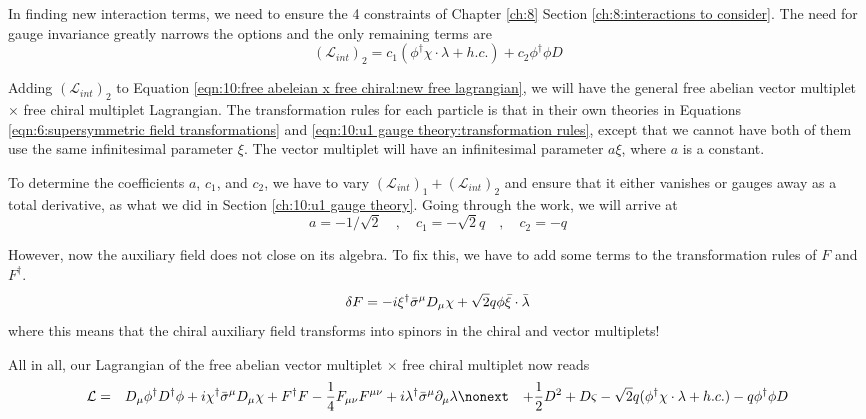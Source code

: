 In finding new interaction terms, we need to ensure the 4 constraints of Chapter \ref{ch:8} Section \ref{ch:8:interactions to consider}. The need for gauge invariance greatly narrows the options and the only remaining terms are
\begin{equation}
    \left(\mathcal{L}_{int}\right)_2 = c_1 \left(\phi^\dagger \chi \cdot \lambda + h.c.\right) + c_2 \phi^\dagger \phi D
\end{equation}

Adding $\left(\mathcal{L}_{int}\right)_2$ to Equation \ref{eqn:10:free abeleian x free chiral:new free lagrangian}, we will have the general free abelian vector multiplet $\times$ free chiral multiplet Lagrangian. The transformation rules for each particle is that in their own theories in Equations \ref{eqn:6:supersymmetric field transformations} and \ref{eqn:10:u1 gauge theory:transformation rules}, except that we cannot have both of them use the same infinitesimal parameter $\xi$. The vector multiplet will have an infinitesimal parameter $a\xi$, where $a$ is a constant. 

To determine the coefficients $a$, $c_1$, and $c_2$, we have to vary $(\mathcal{L}_{int})_1 + (\mathcal{L}_{int})_2$ and ensure that it either vanishes or gauges away as a total derivative, as what we did in Section \ref{ch:10:u1 gauge theory}. Going through the work, we will arrive at 
\begin{equation}
    a = -1 / \sqrt{2} \quad , \quad c_1 = -\sqrt{2} q \quad , \quad c_2 = -q
\end{equation}

However, now the auxiliary field does not close on its algebra. To fix this, we have to add some terms to the transformation rules of $F$ and $F^\dagger$.
\begin{equation}
    \delta F = -i \xi^\dagger \Bar{\sigma}^\mu D_\mu \chi + \sqrt{2}q \phi \Bar{\xi}\cdot\Bar{\lambda}
\end{equation}
where this means that the chiral auxiliary field transforms into spinors in the chiral and vector multiplets!

All in all, our Lagrangian of the free abelian vector multiplet $\times$ free chiral multiplet now reads
\begin{eqnarray}
    \mathcal{L} &=& D_\mu \phi^\dagger D^\dagger \phi + i \chi^\dagger \Bar{\sigma}^\mu D_\mu \chi + F^\dagger F - \frac{1}{4} F_{\mu \nu} F^{\mu \nu} + i \lambda^\dagger \Bar{\sigma}^\mu \partial_\mu \lambda \nonext
    && + \frac{1}{2} D^2 + D \varsigma - \sqrt{2} q (\phi^\dagger \chi \cdot \lambda + h.c.) - q\phi^\dagger \phi D
    \label{eqn:10:free abelian times free chiral lagrangian}
\end{eqnarray}

